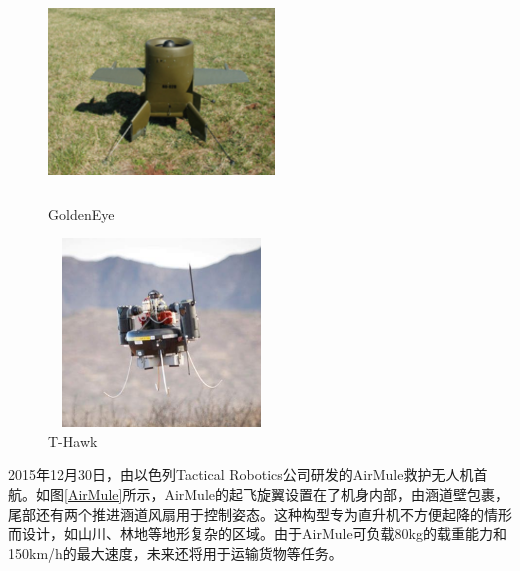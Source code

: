 \begin{figure}[htbp]
	\centering
	\begin{minipage}[c]{0.5\textwidth} %
		\centering
		\includegraphics[width=6cm,height=5cm]{Fig/GoldenEye.png}
		\caption{\label{GoldenEye}GoldenEye}
	\end{minipage}%
	\begin{minipage}[c]{0.5\textwidth}
		\centering
		\includegraphics[width=6cm,height=5cm]{Fig/T-Hawk.png}
		\caption{\label{T-Hawk}T-Hawk}
	\end{minipage}
\end{figure}

2015年12月30日，由以色列Tactical Robotics公司研发的AirMule救护无人机首航。如图\ref{AirMule}所示，AirMule的起飞旋翼设置在了机身内部，由涵道壁包裹，尾部还有两个推进涵道风扇用于控制姿态。这种构型专为直升机不方便起降的情形而设计，如山川、林地等地形复杂的区域。由于AirMule可负载80kg的载重能力和150km/h的最大速度\cite{yuTechnicalAnalysisVTOL2016}，未来还将用于运输货物等任务。



